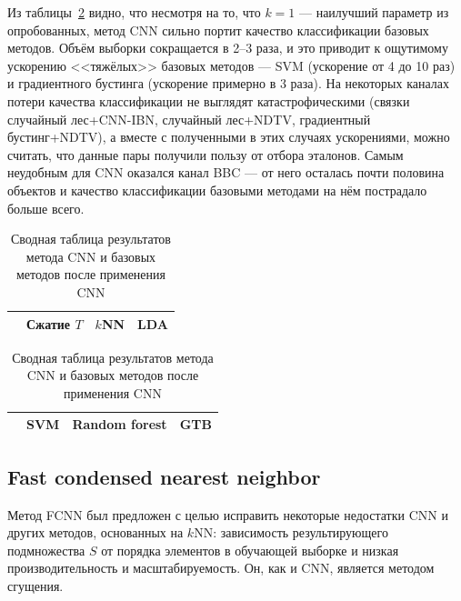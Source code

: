 Из таблицы~\ref{table:cnn-results} видно, что несмотря на то, что \(k=1\) --- наилучший параметр из опробованных, метод CNN сильно портит качество классификации базовых методов. Объём выборки сокращается в 2--3 раза, и это приводит к ощутимому ускорению <<тяжёлых>> базовых методов --- SVM (ускорение от 4 до 10 раз) и градиентного бустинга (ускорение примерно в 3 раза). На некоторых каналах потери качества классификации не выглядят катастрофическими (связки случайный лес+CNN-IBN, случайный лес+NDTV, градиентный бустинг+NDTV), а вместе с полученными в этих случаях ускорениями, можно считать, что данные пары получили пользу от отбора эталонов. Самым неудобным для CNN оказался канал BBC --- от него осталась почти половина объектов и качество классификации базовыми методами на нём пострадало больше всего.

\begin{table}[h!]
    \centering
    \begin{tabular}{|c||c||c|c|}
		\cline{2-4}
		\multicolumn{1}{c||}{} & Сжатие \(T\) & \(k\)NN & LDA \\
		\hline \hline
		
	\end{tabular}
	\newline \vspace*{0.5cm} \newline
	\centering
	\begin{tabular}{|c||c|c|c|}
		\cline{2-4}
		\multicolumn{1}{c||}{} & SVM & Random forest & GTB \\
		\hline \hline
		
    \end{tabular}
    \caption{Сводная таблица результатов метода CNN и базовых методов после применения CNN}
    \label{table:cnn-results}
\end{table}

\subsection{Fast condensed nearest neighbor}
Метод FCNN \cite{angiulli} был предложен с целью исправить некоторые недостатки CNN и других методов, основанных на \(k\)NN: зависимость результирующего подмножества \(S\) от порядка элементов в обучающей выборке и низкая производительность и масштабируемость. Он, как и CNN, является методом сгущения.

